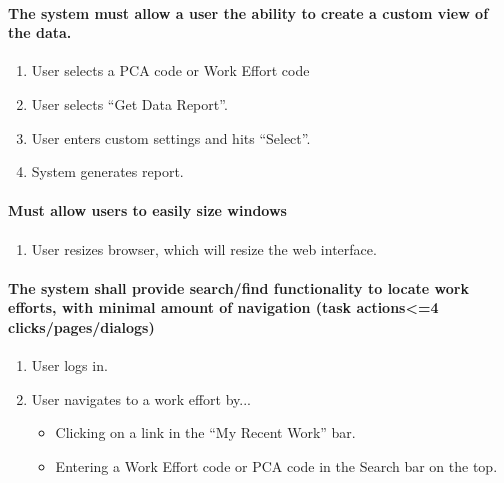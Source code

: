 \documentclass[letterpaper]{article}
\begin{document}
\paragraph{The system must allow a user the ability to create a custom view of the data.}
\begin{enumerate}
\item User selects a PCA code or Work Effort code
\item User selects ``Get Data Report''.
\item User enters custom settings and hits ``Select''.
\item System generates report.
\end{enumerate}

\paragraph{Must allow users to easily size windows}
\begin{enumerate}
\item User resizes browser, which will resize the web interface.
\end{enumerate}

\paragraph{The system shall provide search/find functionality to locate work efforts, with minimal amount of navigation (task actions<=4 clicks/pages/dialogs)}
\begin{enumerate}
\item User logs in.
\item User navigates to a work effort by...
\begin{itemize}
  \item Clicking on a link in the ``My Recent Work'' bar.
  \item Entering a Work Effort code or PCA code in the Search bar on the top.
    \end{itemize}
\end{enumerate}
\end{document}
